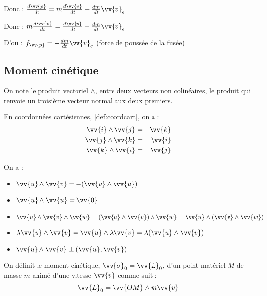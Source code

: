Donc : \( \frac{d\vv{p}}{dt} = m\frac{d\vv{v}}{dt} + \frac{dm}{dt} \vv{v}_e \) \par

Donc : \(m \frac{d\vv{v}}{dt} = \frac{d\vv{p}}{dt} - \frac{dm}{dt} \vv{v}_e \) \par

D'ou : \(f_{\vv{p}} = -\frac{dm}{dt}\vv{v}_e\) (force de poussée de la fusée)
\subsection{Moment cinétique}

\begin{notation}
    On note le produit vectoriel \( \wedge \), entre deux vecteurs non colinéaires, le produit qui renvoie un troisième vecteur normal aux deux premiers.  
\end{notation}

\begin{corollary}
    En coordonnées cartésiennes, \autoref{def:coordcart}, on a : 
    \begin{eqnarray*}
        \vv{i} \wedge \vv{j} &=& \vv{k} \\
        \vv{j} \wedge \vv{k} &=& \vv{i} \\
        \vv{k} \wedge \vv{i} &=& \vv{j}
    \end{eqnarray*}
\end{corollary}

\begin{corollary}
    On a  : 
    \begin{itemize}
        \item \(\vv{u} \wedge \vv{v} = -(\vv{v} \wedge \vv{u})\)
        \item \(\vv{u} \wedge \vv{u} = \vv{0}\)
        \item \(\vv{u} \wedge \vv{v} \wedge \vv{w} = (\vv{u} \wedge \vv{v}) \wedge \vv{w} = \vv{u} \wedge (\vv{v} \wedge  \vv{w})\)   
        \item \(\lambda \vv{u} \wedge \vv{v} = \vv{u} \wedge  \lambda \vv{v} = \lambda (\vv{u} \wedge \vv{v})\)
        \item \(\vv{u} \wedge  \vv{v} \perp (\vv{u},\vv{v})\)  
    \end{itemize}
\end{corollary}

\begin{definition}
    On définit le moment cinétique, \(\vv{\sigma}_{0} = \vv{L}_{0}\), d'un point matériel \(M\) de masse \(m\) animé d'une vitesse \(\vv{v}\) comme suit : 
    \[
        \vv{L}_{0} = \vv{OM} \wedge m\vv{v}
    \]  
\end{definition}

